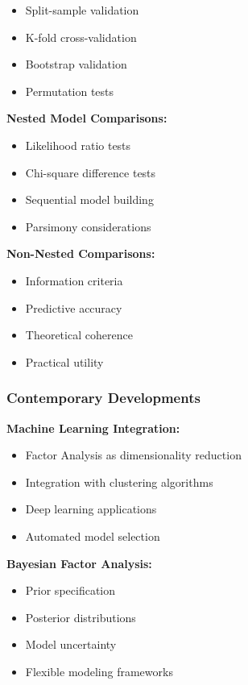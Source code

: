 \documentclass[
]{article}
\begin{document}
\begin{itemize}
\item
  Split-sample validation
\item
  K-fold cross-validation
\item
  Bootstrap validation
\item
  Permutation tests
\end{itemize}

\textbf{Nested Model Comparisons:}

\begin{itemize}
\item
  Likelihood ratio tests
\item
  Chi-square difference tests
\item
  Sequential model building
\item
  Parsimony considerations
\end{itemize}

\textbf{Non-Nested Comparisons:}

\begin{itemize}
\item
  Information criteria
\item
  Predictive accuracy
\item
  Theoretical coherence
\item
  Practical utility
\end{itemize}

\subsubsection{Contemporary Developments}

\textbf{Machine Learning Integration:}

\begin{itemize}
\item
  Factor Analysis as dimensionality reduction
\item
  Integration with clustering algorithms
\item
  Deep learning applications
\item
  Automated model selection
\end{itemize}

\textbf{Bayesian Factor Analysis:}

\begin{itemize}
\item
  Prior specification
\item
  Posterior distributions
\item
  Model uncertainty
\item
  Flexible modeling frameworks
\end{itemize}
\end{document}
